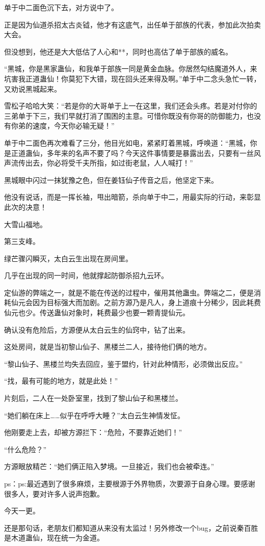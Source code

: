 \begin{this_body}
单于中二面色沉下去，对方说中了。

正是因为仙道杀招太古炎钺，他才有这底气，出任单于部族的代表，参加此次拍卖大会。

但没想到，他还是大大低估了人心和**，同时也高估了单于部族的威名。

“黑城，你是黑家蛊仙，和我单于部族一同是黄金血脉。你居然勾结魔道外人，来坑害我正道蛊仙！你莫犯下大错，现在回头还来得及啊。”单于中二念头急忙一转，又劝说黑城起来。

雪松子哈哈大笑：“若是你的大哥单于上一在这里，我们还会头疼。若是对付你的三弟单于下三，我们早就打消了围困的主意。可惜你既没有你哥的防御能力，也没有你弟的速度，今天你必输无疑！”

单于中二面色再次难看了三分，他目光如电，紧紧盯着黑城，呼唤道：“黑城，你是正道蛊仙，多年来的名声不要了吗？今天这件事情要是暴露出去，只要有一丝风声流传出去，你必将受千夫所指，如过街老鼠，人人喊打！”

黑城眼中闪过一抹犹豫之色，但在姜钰仙子传音之后，他坚定下来。

他没有说话，而是一挥长袖，甩出暗箭，杀向单于中二，用最实际的行动，来彰显此次的决意！

大雪山福地。

第三支峰。

绿芒骤闪瞬灭，太白云生出现在房间里。

几乎在出现的同一时间，他就撑起防御杀招九云环。

定仙游的弊端之一，就是不能在传送的过程中，催用其他蛊虫。弊端之二，便是消耗仙元会因为目标强大而加剧。之前方源乃是凡人，身上道痕十分稀少，因此耗费仙元也少。传送蛊仙对象时，耗费最少也要一颗青提仙元。

确认没有危险后，方源便从太白云生的仙窍中，钻了出来。

这处房间，就是当初黎山仙子、黑楼兰二人，接待他们俩的地方。

“黎山仙子、黑楼兰均失去回应，鉴于盟约，针对此种情形，必须做出反应。”

“找，最有可能的地方，就是此处！”

片刻后，二人在一处卧室里，找到了黎山仙子和黑楼兰。

“她们躺在床上……似乎在呼呼大睡？”太白云生神情发怔。

他刚要走上去，却被方源拦下：“危险，不要靠近她们！”

“什么危险？”

方源眼放精芒：“她们俩正陷入梦境。一旦接近，我们也会被牵连。”

ps：ps:最近遇到了很多麻烦，主要根源于外界物质，次要源于自身心理。要感谢很多人，要对许多人说声抱歉。

今天一更。

还是那句话，老朋友们都知道从来没有太监过！另外修改一个bug，之前说秦百胜是木道蛊仙，现在统一为金道。

\end{this_body}

